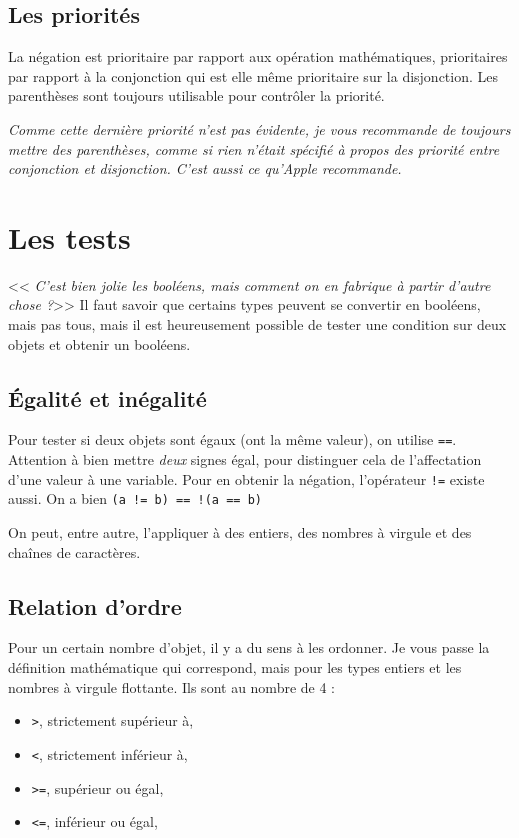 \subsection{Les priorités}
La négation est prioritaire par rapport aux opération mathématiques, prioritaires par rapport à la conjonction qui est elle même prioritaire sur la disjonction. Les parenthèses sont toujours utilisable pour contrôler la priorité.

\emph{Comme cette dernière priorité n'est pas évidente, je vous recommande de toujours mettre des parenthèses, comme si rien n'était spécifié à propos des priorité entre conjonction et disjonction. C'est aussi ce qu'\emph{Apple} recommande.}
\section{Les tests}
<< \emph{C'est bien jolie les booléens, mais comment on en fabrique à partir d'autre chose ?}>>
Il faut savoir que certains types peuvent se convertir en booléens, mais pas tous, mais il est heureusement possible de tester une condition sur deux objets et obtenir un booléens.
\subsection{Égalité et inégalité}
Pour tester si deux objets sont égaux (ont la même valeur),
on utilise \verb"==". Attention à bien mettre \emph{deux} signes égal, pour distinguer cela de l'affectation d'une valeur à une variable. Pour  en obtenir la négation, l'opérateur \verb"!=" existe aussi. On a bien \texttt{(a != b) == !(a == b)}

On peut, entre autre, l'appliquer à des entiers, des nombres à virgule et des chaînes de caractères.
\subsection{Relation d'ordre}
Pour un certain nombre d'objet, il y a du sens à les ordonner.
Je vous passe la définition mathématique qui correspond, mais pour les types entiers et les nombres à virgule flottante.
Ils sont au nombre de 4 :
\begin{itemize}
\item \verb">", strictement supérieur à,
\item \verb"<", strictement inférieur à,
\item \verb">=", supérieur ou égal,
\item \verb"<=", inférieur ou égal,
\end{itemize}

